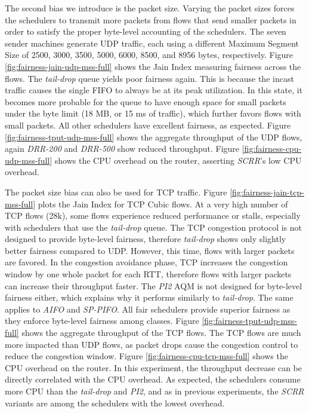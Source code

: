 The second bias we introduce is the packet size. Varying the packet
sizes forces the schedulers to transmit more packets from flows that
send smaller packets in order to satisfy the proper byte-level
accounting of the schedulers. The seven sender machines generate UDP
traffic, each using a different Maximum Segment Size of 2500, 3000,
3500, 5000, 6000, 8500, and 8956 bytes,
respectively. Figure \ref{fig:fairness-jain-udp-mss-full} shows the Jain
Index measuring fairness across the flows. The \textit{tail-drop}
queue yields poor fairness again. This is because the incast traffic
causes the single FIFO to always be at its peak utilization. In this
state, it becomes more probable for the queue to have enough space for
small packets under the byte limit (18 MB, or 15 ms of traffic), which
further favors flows with small packets. All other schedulers have
excellent fairness, as
expected. Figure \ref{fig:fairness-tput-udp-mss-full} shows the
aggregate throughput of the UDP flows, again \textit{DRR-200} and
\textit{DRR-500} show reduced
throughput. Figure \ref{fig:fairness-cpu-udp-mss-full} shows the CPU
overhead on the router, asserting \textit{SCRR}'s low CPU overhead.

The packet size bias can also be used for TCP
traffic. Figure \ref{fig:fairness-jain-tcp-mss-full} plots the Jain
Index for TCP Cubic flows. At a very high number of TCP flows (28k),
some flows experience reduced performance or stalls, especially with
schedulers that use the \textit{tail-drop} queue. The TCP congestion
protocol is not designed to provide byte-level fairness, therefore
\textit{tail-drop} shows only slightly better fairness compared to
UDP. However, this time, flows with larger packets are favored. In the
congestion avoidance phase, TCP increases the congestion window by one
whole packet for each RTT, therefore flows with larger packets can
increase their throughput faster. The \textit{PI2} AQM is not designed
for byte-level fairness either, which explains why it performs
similarly to \textit{tail-drop}. The same applies to \textit{AIFO} and
\textit{SP-PIFO}. All fair schedulers provide superior fairness as
they enforce byte-level fairness among
classes. Figure \ref{fig:fairness-tput-udp-mss-full} shows the aggregate
throughput of the TCP flows. The TCP flows are much more impacted than
UDP flows, as packet drops cause the congestion control to reduce the
congestion window. Figure \ref{fig:fairness-cpu-tcp-mss-full} shows the
CPU overhead on the router. In this experiment, the throughput
decrease can be directly correlated with the CPU overhead. As
expected, the schedulers consume more CPU than the \textit{tail-drop}
and \textit{PI2}, and as in previous experiments, the \textit{SCRR}
variants are among the schedulers with the lowest overhead.

